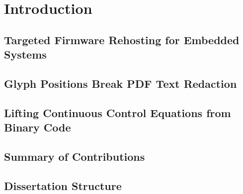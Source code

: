 \chapter{Introduction}

\section{Targeted Firmware Rehosting for Embedded Systems}

\section{Glyph Positions Break PDF Text Redaction}

\section{Lifting Continuous Control Equations from Binary Code}

\section{Summary of Contributions}

\section{Dissertation Structure}
